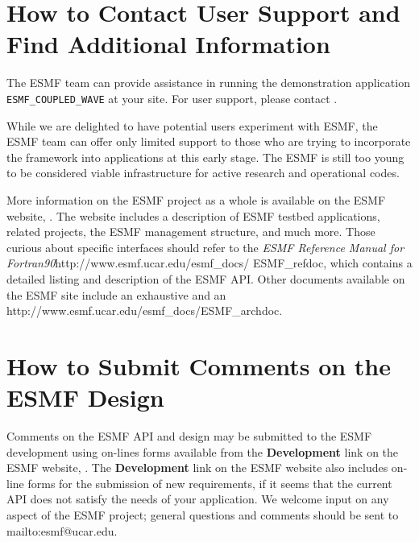 \section{How to Contact User Support and Find Additional Information}
\label{sec:Support}
The ESMF team can provide assistance in running the demonstration application 
{\tt ESMF\_COUPLED\_WAVE} at your site.  For user support, please contact 
.  

While we are delighted to have potential users experiment with ESMF, the
ESMF team can offer only limited support to those who are trying to incorporate 
the framework into applications at this early stage.  The ESMF is still
too young to be considered viable infrastructure for active research and 
operational codes.  

More information on the ESMF project as a whole is available on the 
ESMF website, .  
The website includes a description of ESMF testbed applications, related projects,
the ESMF management structure, and much more.  Those curious about specific 
interfaces should refer to the \htmladdnormallink
{{\it ESMF Reference Manual for Fortran90}}{http://www.esmf.ucar.edu/esmf_docs/
ESMF_refdoc}, which contains a detailed listing and description of 
the ESMF API.  Other documents available on the ESMF site include an exhaustive
and an 
{http://www.esmf.ucar.edu/esmf_docs/ESMF_archdoc}.

\section{How to Submit Comments on the ESMF Design}
\label{sec:Submission}
Comments on the ESMF API and design may be submitted to the ESMF development 
using on-lines forms available from the {\bf Development} link on the ESMF 
website, .  
The {\bf Development} 
link on the ESMF website also includes on-line forms for the submission of 
new requirements, if it seems that the current API does not satisfy the needs of 
your application.  We welcome input on any aspect of the ESMF project; general
questions and comments should be sent to 
{mailto:esmf@ucar.edu}.







